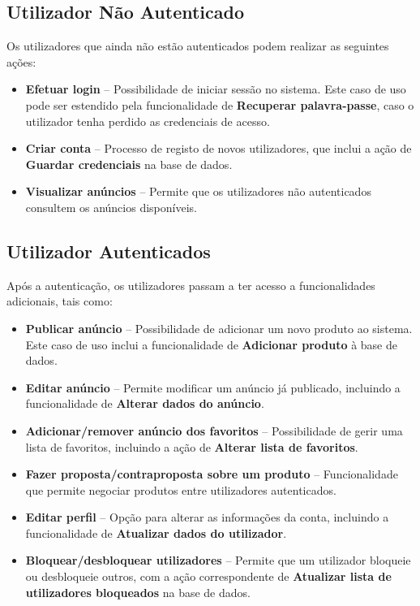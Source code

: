 \documentclass[a4paper, 12pt]{article} %
\begin{document}
\subsection{Utilizador Não Autenticado}
Os utilizadores que ainda não estão autenticados podem realizar as seguintes ações:
\begin{itemize}
	\item \textbf{Efetuar login} – Possibilidade de iniciar sessão no sistema. Este caso de uso pode ser estendido pela funcionalidade de \textbf{Recuperar palavra-passe}, caso o utilizador tenha perdido as credenciais de acesso.
	\item \textbf{Criar conta} – Processo de registo de novos utilizadores, que inclui a ação de \textbf{Guardar credenciais} na base de dados.
	\item \textbf{Visualizar anúncios} – Permite que os utilizadores não autenticados consultem os anúncios disponíveis.
\end{itemize}

\subsection{Utilizador Autenticados}
Após a autenticação, os utilizadores passam a ter acesso a funcionalidades adicionais, tais como:
\begin{itemize}
	\item \textbf{Publicar anúncio} – Possibilidade de adicionar um novo produto ao sistema. Este caso de uso inclui a funcionalidade de \textbf{Adicionar produto} à base de dados.
	\item \textbf{Editar anúncio} – Permite modificar um anúncio já publicado, incluindo a funcionalidade de \textbf{Alterar dados do anúncio}.
	\item \textbf{Adicionar/remover anúncio dos favoritos} – Possibilidade de gerir uma lista de favoritos, incluindo a ação de \textbf{Alterar lista de favoritos}.
	\item \textbf{Fazer proposta/contraproposta sobre um produto} – Funcionalidade que permite negociar produtos entre utilizadores autenticados.
	\item \textbf{Editar perfil} – Opção para alterar as informações da conta, incluindo a funcionalidade de \textbf{Atualizar dados do utilizador}.
	\item \textbf{Bloquear/desbloquear utilizadores} – Permite que um utilizador bloqueie ou desbloqueie outros, com a ação correspondente de \textbf{Atualizar lista de utilizadores bloqueados} na base de dados.
\end{itemize}
\end{document}
